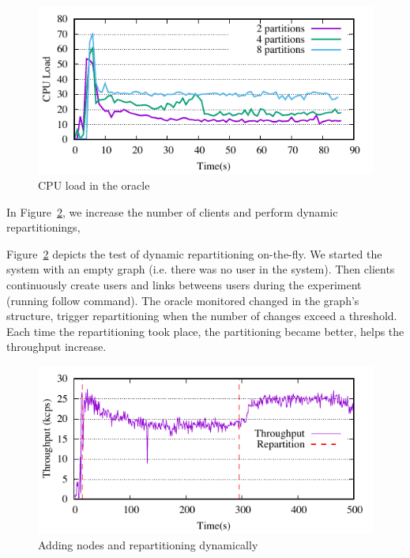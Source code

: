 \begin{figure}[t]
	\includegraphics{figures/experiments/oracle-load}
	\caption{CPU load in the oracle}
	\label{fig:cpu_oracle}
\end{figure}

In Figure~\ref{fig:dynamic_load_tput}, we increase the number of clients and perform dynamic repartitionings,

Figure~\ref{fig:dynamic_load_tput} depicts the test of dynamic repartitioning on-the-fly. 
We started the system with an empty graph (i.e. there was no user in the system). 
Then clients continuously create users and links betweens users during the experiment (running follow command). 
The oracle monitored changed in the graph's structure, trigger repartitioning when the number of changes exceed a threshold. 
Each time the repartitioning took place, the partitioning became better, helps the throughput increase. 

\begin{figure}[ht]
	\includegraphics{figures/experiments/dynamicload-tp-move-4p}
	\caption{Adding nodes and repartitioning dynamically}
	\label{fig:dynamic_load_tput}
\end{figure}

